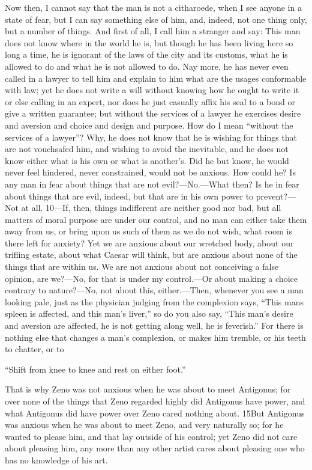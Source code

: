 Now then, I cannot say that the man is not a citharoede, when I see anyone in a state of fear, but I can say something else of him, and, indeed, not one thing only, but a number of things. And first of all, I call him a stranger and say: This man does not know where in the world he is, but though he has been living here so long a time, he is ignorant of the laws of the city and its customs, what he is allowed to do and what he is not allowed to do. Nay more, he has never even called in a lawyer to tell him and explain to him what are the usages conformable with law; yet he does not write a will without knowing how he ought to write it or else calling in an expert, nor does he just casually affix his seal to a bond or give a written guarantee; but without the services of a lawyer he exercises desire and aversion and choice and design and purpose. How do I mean ``without the services of a lawyer''? Why, he does not know that he is wishing for things that are not vouchsafed him, and wishing to avoid the inevitable, and he does not know either what is his own or what is another's. Did he but know, he would never feel hindered, never constrained, would not be anxious. How could he? Is any man in fear about things that are not evil?—No.—What then? Is he in fear about things that are evil, indeed, but that are in his own power to prevent?—Not at all. 10—If, then, things indifferent are neither good nor bad, but all matters of moral purpose are under our control, and no man can either take them away from us, or bring upon us such of them as we do not wish, what room is there left for anxiety? Yet we are anxious about our wretched body, about our trifling estate, about what Caesar will think, but are anxious about none of the things that are within us. We are not anxious about not conceiving a false opinion, are we?—No, for that is under my control.—Or about making a choice contrary to nature?—No, not about this, either.—Then, whenever you see a man looking pale, just as the physician judging from the complexion says, ``This mans spleen is affected, and this man's liver,'' so do you also say, ``This man's desire and aversion are affected, he is not getting along well, he is feverish.'' For there is nothing else that changes a man's complexion, or makes him tremble, or his teeth to chatter, or to

``Shift from knee to knee and rest on either foot.''

That is why Zeno was not anxious when he was about to meet Antigonus; for over none of the things that Zeno regarded highly did Antigonus have power, and what Antigonus did have power over Zeno cared nothing about. 15But Antigonus was anxious when he was about to meet Zeno, and very naturally so; for he wanted to please him, and that lay outside of his control; yet Zeno did not care about pleasing him, any more than any other artist cares about pleasing one who has no knowledge of his art.

